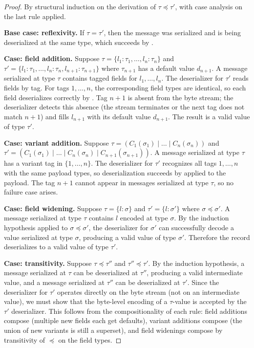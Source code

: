 \documentclass[11pt,a4paper]{article}
\begin{document}
\begin{proof}
By structural induction on the derivation of $\tau \preceq \tau'$, with case
analysis on the last rule applied.

\medskip\noindent\textbf{Base case: reflexivity.}
If $\tau = \tau'$, then the message was serialized and is being deserialized
at the same type, which succeeds by .

\medskip\noindent\textbf{Case: field addition.}
Suppose $\tau = \{l_1:\tau_1, \ldots, l_n:\tau_n\}$ and
$\tau' = \{l_1:\tau_1, \ldots, l_n:\tau_n, l_{n+1}:\tau_{n+1}\}$ where
$\tau_{n+1}$ has a default value $d_{n+1}$. A message serialized at type
$\tau$ contains tagged fields for $l_1, \ldots, l_n$. The deserializer for
$\tau'$ reads fields by tag. For tags $1, \ldots, n$, the corresponding
field types are identical, so each field deserializes correctly by
. Tag $n{+}1$ is absent from the byte stream; the
deserializer detects this absence (the stream terminates or the next tag
does not match $n{+}1$) and fills $l_{n+1}$ with its default value $d_{n+1}$.
The result is a valid value of type $\tau'$.

\medskip\noindent\textbf{Case: variant addition.}
Suppose $\tau = (C_1(\sigma_1) \mid \ldots \mid C_n(\sigma_n))$ and
$\tau' = (C_1(\sigma_1) \mid \ldots \mid C_n(\sigma_n) \mid C_{n+1}(\sigma_{n+1}))$.
A message serialized at type $\tau$ has a variant tag in $\{1, \ldots, n\}$.
The deserializer for $\tau'$ recognizes all tags $1, \ldots, n$ with the same
payload types, so deserialization succeeds by  applied to
the payload. The tag $n{+}1$ cannot appear in messages serialized at type
$\tau$, so no failure case arises.

\medskip\noindent\textbf{Case: field widening.}
Suppose $\tau = \{l:\sigma\}$ and $\tau' = \{l:\sigma'\}$ where $\sigma
\preceq \sigma'$. A message serialized at type $\tau$ contains $l$ encoded
at type $\sigma$. By the induction hypothesis applied to $\sigma \preceq
\sigma'$, the deserializer for $\sigma'$ can successfully decode a value
serialized at type $\sigma$, producing a valid value of type $\sigma'$.
Therefore the record deserializes to a valid value of type $\tau'$.

\medskip\noindent\textbf{Case: transitivity.}
Suppose $\tau \preceq \tau''$ and $\tau'' \preceq \tau'$. By the induction
hypothesis, a message serialized at $\tau$ can be deserialized at $\tau''$,
producing a valid intermediate value, and a message serialized at $\tau''$
can be deserialized at $\tau'$. Since the deserializer for $\tau'$ operates
directly on the byte stream (not on an intermediate value), we must show
that the byte-level encoding of a $\tau$-value is accepted by the $\tau'$
deserializer. This follows from the compositionality of each rule: field
additions compose (multiple new fields each get defaults), variant additions
compose (the union of new variants is still a superset), and field widenings
compose by transitivity of $\preceq$ on the field types.
\end{proof}
\end{document}
